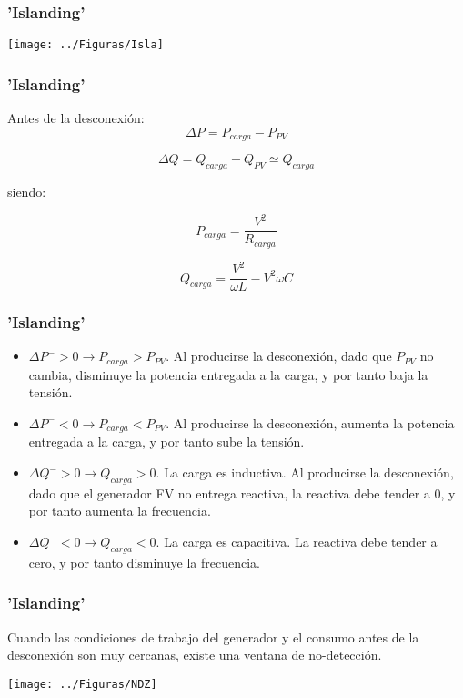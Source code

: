 \documentclass[serif, xcolor=dvipsnames]{beamer}
\begin{document}
\begin{frame}
  \frametitle{'Islanding'}

  \begin{center}
    \texttt{[image: ../Figuras/Isla]}
    \par\end{center}


\end{frame}
\begin{frame}
  \frametitle{'Islanding'}

  Antes de la desconexión:\[ \Delta P=P_{carga}-P_{PV}\]


\[
\Delta Q=Q_{carga}-Q_{PV}\simeq Q_{carga}\]


siendo:

\[
P_{carga}=\frac{V^{2}}{R_{carga}}\]


\[
Q_{carga}=\frac{V^{2}}{\omega L}-V^{2}\omega C\]



\end{frame}
\begin{frame}
  \frametitle{'Islanding'}
  \begin{itemize}
  \item $\Delta P^{-}>0\rightarrow P_{carga}>P_{PV}$. Al producirse la
    desconexión, dado que $P_{PV}$ no cambia, disminuye la potencia
    entregada a la carga, y por tanto baja la tensión.
  \item $\Delta P^{-}<0\rightarrow P_{carga}<P_{PV}$. Al producirse la
    desconexión, aumenta la potencia entregada a la carga, y por tanto
    sube la tensión.
  \item $\Delta Q^{-}>0\rightarrow Q_{carga}>0$. La carga es
    inductiva. Al producirse la desconexión, dado que el generador FV
    no entrega reactiva, la reactiva debe tender a 0, y por tanto
    aumenta la frecuencia.
  \item $\Delta Q^{-}<0\rightarrow Q_{carga}<0$. La carga es
    capacitiva.  La reactiva debe tender a cero, y por tanto disminuye
    la frecuencia.
  \end{itemize}

\end{frame}
\begin{frame}
  \frametitle{'Islanding'}

  Cuando las condiciones de trabajo del generador y el consumo antes
  de la desconexión son muy cercanas, existe una ventana de
  no-detección.

  \begin{center}
    \texttt{[image: ../Figuras/NDZ]}
    \par\end{center}


\end{frame}
\end{document}

